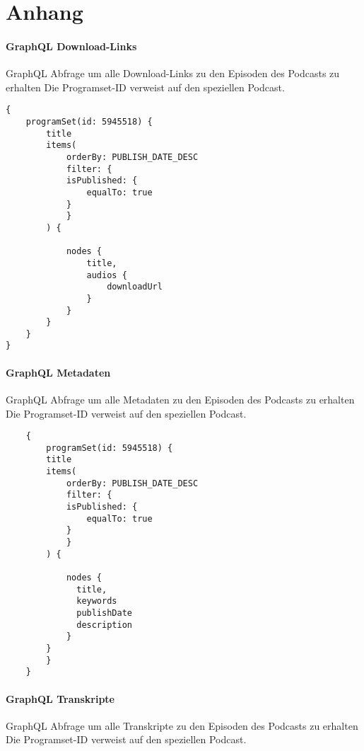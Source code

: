 \chapter{Anhang}\label{app:supplemental-information}


\label{graphql-1}
\subsubsection*{GraphQL Download-Links}
GraphQL Abfrage um alle Download-Links zu den Episoden des Podcasts  zu erhalten
Die Programset-ID verweist auf den speziellen Podcast.

\begin{verbatim}
{
    programSet(id: 5945518) {
        title
        items(
            orderBy: PUBLISH_DATE_DESC
            filter: {
            isPublished: {
                equalTo: true
            }
            }
        ) {
            
            nodes {
                title,
                audios {
                    downloadUrl
                }
            }
        }
    }
}

\end{verbatim}

\label{ch:graphql-2}
\subsubsection*{GraphQL Metadaten}
GraphQL Abfrage um alle Metadaten zu den Episoden des Podcasts  zu erhalten
Die Programset-ID verweist auf den speziellen Podcast.

\begin{verbatim}
    {
        programSet(id: 5945518) {
        title
        items(
            orderBy: PUBLISH_DATE_DESC
            filter: {
            isPublished: {
                equalTo: true
            }
            }
        ) {
          	
            nodes {
              title,
              keywords
              publishDate
              description
            }
        }
        }
    }

\end{verbatim}

\label{ch:graphql-3}
\subsubsection*{GraphQL Transkripte}

GraphQL Abfrage um alle Transkripte zu den Episoden des Podcasts   zu erhalten
Die Programset-ID verweist auf den speziellen Podcast.

